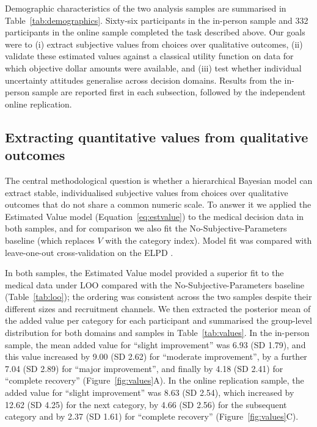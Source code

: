 \documentclass[11pt]{article}
\begin{document}
Demographic characteristics of the two analysis samples are summarised in Table~\ref{tab:demographics}. Sixty-six participants in the in-person sample and 332 participants in the online sample completed the task described above. Our goals were to (i) extract subjective values from choices over qualitative outcomes, (ii) validate these estimated values against a classical utility function on data for which objective dollar amounts were available, and (iii) test whether individual uncertainty attitudes generalise across decision domains. Results from the in-person sample are reported first in each subsection, followed by the independent online replication.

\subsection{Extracting quantitative values from qualitative outcomes}

The central methodological question is whether a hierarchical Bayesian model can extract stable, individualised subjective values from choices over qualitative outcomes that do not share a common numeric scale. To answer it we applied the Estimated Value model (Equation~\ref{eq:estvalue}) to the medical decision data in both samples, and for comparison we also fit the No-Subjective-Parameters baseline (which replaces $V$ with the category index). Model fit was compared with leave-one-out cross-validation on the ELPD \citep{vehtari2017loo}.

In both samples, the Estimated Value model provided a superior fit to the medical data under LOO compared with the No-Subjective-Parameters baseline (Table~\ref{tab:loo}); the ordering was consistent across the two samples despite their different sizes and recruitment channels. We then extracted the posterior mean of the added value per category for each participant and summarised the group-level distribution for both domains and samples in Table~\ref{tab:values}. In the in-person sample, the mean added value for ``slight improvement'' was 6.93 (SD 1.79), and this value increased by 9.00 (SD 2.62) for ``moderate improvement'', by a further 7.04 (SD 2.89) for ``major improvement'', and finally by 4.18 (SD 2.41) for ``complete recovery'' (Figure~\ref{fig:values}A). In the online replication sample, the added value for ``slight improvement'' was 8.63 (SD 2.54), which increased by 12.62 (SD 4.25) for the next category, by 4.66 (SD 2.56) for the subsequent category and by 2.37 (SD 1.61) for ``complete recovery'' (Figure~\ref{fig:values}C).
\end{document}
